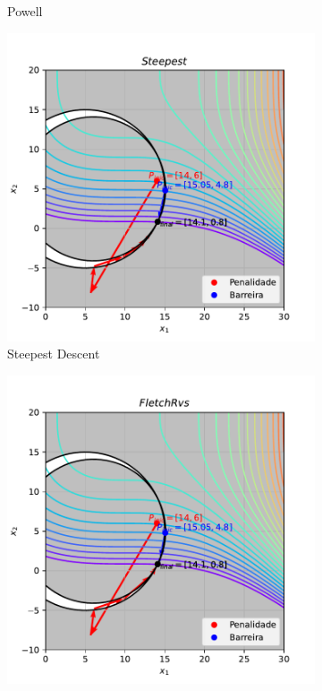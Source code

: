 \documentclass[10pt, a4paper]{article}
\begin{document}
\begin{figure}[htpb]
\begin{subfigure}[b]{0.32\textwidth}
    \caption{Powell}
    \label{fig:q3_powell}
  \end{subfigure}
  \hfill
  \begin{subfigure}[b]{0.32\textwidth}
    \centering
    \includegraphics[width=\textwidth]{images/q3_Steepest.pdf}
    \caption{Steepest Descent}
    \label{fig:q3_steepest}
  \end{subfigure}
  \hfill
  \begin{subfigure}[b]{0.32\textwidth}
    \centering
    \includegraphics[width=\textwidth]{images/q3_FletchRvs.pdf}

\end{subfigure}
\end{figure}
\end{document}
